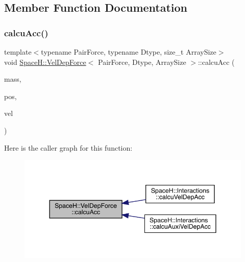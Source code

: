 \subsection{Member Function Documentation}
\mbox{\label{struct_space_h_1_1_vel_dep_force_af317008a8a1371f2a36f9b44835343f2}} 
\subsubsection{\texorpdfstring{calcu\+Acc()}{calcuAcc()}\hspace{0.1cm}{\footnotesize\ttfamily [1/2]}}
{\footnotesize\ttfamily template$<$typename Pair\+Force, typename Dtype, size\+\_\+t Array\+Size$>$ \\
void \mbox{\hyperlink{struct_space_h_1_1_vel_dep_force}{Space\+H\+::\+Vel\+Dep\+Force}}$<$ Pair\+Force, Dtype, Array\+Size $>$\+::calcu\+Acc (\begin{DoxyParamCaption}\item[{const \mbox{\hyperlink{struct_space_h_1_1_vel_dep_force_ae4efbb88779fc063293b7853184378ac}{Scalar\+Array}} \&}]{mass,  }\item[{const \mbox{\hyperlink{struct_space_h_1_1_vel_dep_force_ad2d0301ffff67a74018b92c17a3475de}{Vector\+Array}} \&}]{pos,  }\item[{const \mbox{\hyperlink{struct_space_h_1_1_vel_dep_force_ad2d0301ffff67a74018b92c17a3475de}{Vector\+Array}} \&}]{vel }\end{DoxyParamCaption})\hspace{0.3cm}{\ttfamily [inline]}}

Here is the caller graph for this function\+:
\nopagebreak
\begin{figure}[H]
\begin{center}
\leavevmode
\includegraphics[width=344pt]{struct_space_h_1_1_vel_dep_force_af317008a8a1371f2a36f9b44835343f2_icgraph}
\end{center}
\end{figure}
\mbox{\label{struct_space_h_1_1_vel_dep_force_a0c90022c26911e9471e9d340e512124b}} 
